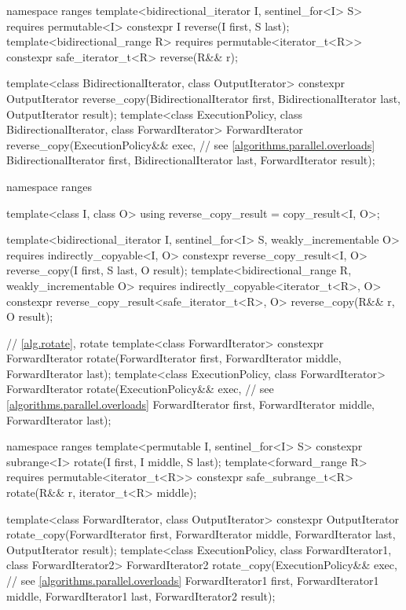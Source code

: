 \begin{codeblock}
{  namespace ranges {
    template<bidirectional_iterator I, sentinel_for<I> S>
      requires permutable<I>
      constexpr I reverse(I first, S last);
    template<bidirectional_range R>
      requires permutable<iterator_t<R>>
      constexpr safe_iterator_t<R> reverse(R&& r);
  }

  template<class BidirectionalIterator, class OutputIterator>
    constexpr OutputIterator
      reverse_copy(BidirectionalIterator first, BidirectionalIterator last,
                   OutputIterator result);
  template<class ExecutionPolicy, class BidirectionalIterator, class ForwardIterator>
    ForwardIterator
      reverse_copy(ExecutionPolicy&& exec,                      // see \ref{algorithms.parallel.overloads}
                   BidirectionalIterator first, BidirectionalIterator last,
                   ForwardIterator result);

  namespace ranges {
    template<class I, class O>
    using reverse_copy_result = copy_result<I, O>;

    template<bidirectional_iterator I, sentinel_for<I> S, weakly_incrementable O>
      requires indirectly_copyable<I, O>
      constexpr reverse_copy_result<I, O>
        reverse_copy(I first, S last, O result);
    template<bidirectional_range R, weakly_incrementable O>
      requires indirectly_copyable<iterator_t<R>, O>
      constexpr reverse_copy_result<safe_iterator_t<R>, O>
        reverse_copy(R&& r, O result);
  }

  // \ref{alg.rotate}, rotate
  template<class ForwardIterator>
    constexpr ForwardIterator rotate(ForwardIterator first,
                                     ForwardIterator middle,
                                     ForwardIterator last);
  template<class ExecutionPolicy, class ForwardIterator>
    ForwardIterator rotate(ExecutionPolicy&& exec,              // see \ref{algorithms.parallel.overloads}
                           ForwardIterator first,
                           ForwardIterator middle,
                           ForwardIterator last);

  namespace ranges {
    template<permutable I, sentinel_for<I> S>
      constexpr subrange<I> rotate(I first, I middle, S last);
    template<forward_range R>
      requires permutable<iterator_t<R>>
      constexpr safe_subrange_t<R> rotate(R&& r, iterator_t<R> middle);
  }

  template<class ForwardIterator, class OutputIterator>
    constexpr OutputIterator
      rotate_copy(ForwardIterator first, ForwardIterator middle,
                  ForwardIterator last, OutputIterator result);
  template<class ExecutionPolicy, class ForwardIterator1, class ForwardIterator2>
    ForwardIterator2
      rotate_copy(ExecutionPolicy&& exec,                       // see \ref{algorithms.parallel.overloads}
                  ForwardIterator1 first, ForwardIterator1 middle,
                  ForwardIterator1 last, ForwardIterator2 result);

}
\end{codeblock}
